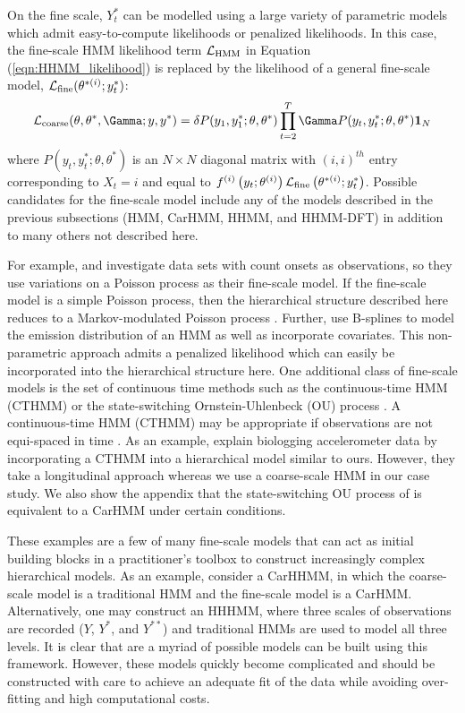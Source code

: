 On the fine scale, $Y^*_t$ can be modelled using a large variety of parametric models which admit easy-to-compute likelihoods or penalized likelihoods. In this case, the fine-scale HMM likelihood term $\mathcal{L}_{\text{HMM}}$ in Equation (\ref{eqn:HHMM_likelihood}) is replaced by the likelihood of a general fine-scale model, $\mathcal{L}_{\text{fine}}(\theta^{*(i)};y^*_t)$:
\[
\calL_{\text{coarse}}(\theta,\theta^*,\Gamma;y,y^*) = \delta P(y_1,y^*_1;\theta,\theta^*) \prod_{t=2}^T \Gamma P(y_t,y^*_t;\theta,\theta^*) \mathbf{1}_N
\]
where $P(y_t,y^*_t;\theta,\theta^*) $ is an $N \times N$ diagonal matrix with $(i,i)^{th}$ entry corresponding to $X_t=i$ and equal to $f^{(i)}\left(y_t;\theta^{(i)}\right)\mathcal{L}_{\text{fine}}\left(\theta^{*(i)};y^*_t\right)$. 
%
Possible candidates for the fine-scale model include any of the models described in the previous subsections (HMM, CarHMM, HHMM, and HHMM-DFT) in addition to many others not described here.

For example, \citet{Bebbington:2007} and \citet{Borchers:2013} investigate data sets with count onsets as observations, so they use variations on a Poisson process as their fine-scale model. If the fine-scale model is a simple Poisson process, then the hierarchical structure described here reduces to a Markov-modulated Poisson process \citep{Fischer:1993}.
Further, \citep{Langrock:2018} use B-splines to model the emission distribution of an HMM as well as incorporate covariates. This non-parametric approach admits a penalized likelihood which can easily be incorporated into the hierarchical structure here. 
One additional class of fine-scale models is the set of continuous time methods such as the continuous-time HMM (CTHMM) \citep{Liu:2015} or the state-switching Ornstein-Uhlenbeck (OU) process \citep{Michelot:2019}. 
A continuous-time HMM (CTHMM) may be appropriate if observations are not equi-spaced in time \citep{Liu:2015}. As an example, \citet{Xu:2018} explain biologging accelerometer data by incorporating a CTHMM into a hierarchical model similar to ours. However, they take a longitudinal approach whereas we use a coarse-scale HMM in our case study. We also show the appendix that the state-switching OU process of \citet{Michelot:2019} is equivalent to a CarHMM under certain conditions.

These examples are a few of many fine-scale models that can act as initial building blocks in a practitioner's toolbox to construct increasingly complex hierarchical models. As an example, consider a CarHHMM, in which the coarse-scale model is a traditional HMM and the fine-scale model is a CarHMM. Alternatively, one may construct an HHHMM, where three scales of observations are recorded ($Y$, $Y^*$, and $Y^{**}$) and traditional HMMs are used to model all three levels. It is clear that are a myriad of possible models can be built using this framework. However, these models quickly become complicated and should be constructed with care to achieve an adequate fit of the data while avoiding over-fitting and high computational costs.